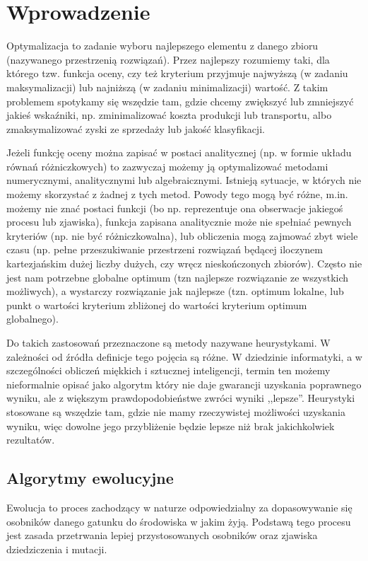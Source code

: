 \documentclass[./FM_mgr.tex]{subfiles}
\begin{document}
\chapter{Wprowadzenie}

Optymalizacja to zadanie wyboru najlepszego elementu z danego zbioru (nazywanego przestrzenią rozwiązań). 
Przez najlepszy rozumiemy taki, dla którego tzw. funkcja oceny, czy też kryterium przyjmuje najwyższą (w zadaniu maksymalizacji) lub najniższą (w zadaniu minimalizacji) wartość. 
Z takim problemem spotykamy się wszędzie tam, gdzie chcemy zwiększyć lub zmniejszyć jakieś wskaźniki, np. zminimalizować koszta produkcji lub transportu, albo zmaksymalizować zyski ze sprzedaży lub jakość klasyfikacji.

Jeżeli funkcję oceny można zapisać w postaci analitycznej (np. w formie układu równań różniczkowych) to zazwyczaj możemy ją optymalizować metodami numerycznymi, analitycznymi lub algebraicznymi. 
Istnieją sytuacje, w których nie możemy skorzystać z żadnej z tych metod. 
Powody tego mogą być różne, m.in. możemy nie znać postaci funkcji (bo np. reprezentuje ona obserwacje jakiegoś procesu lub zjawiska), funkcja zapisana analitycznie może nie spełniać pewnych kryteriów (np. nie być różniczkowalna), lub obliczenia mogą zajmować zbyt wiele czasu (np. pełne przeszukiwanie przestrzeni rozwiązań będącej iloczynem kartezjańskim dużej liczby dużych, czy wręcz nieskończonych zbiorów). 
Często nie jest nam potrzebne globalne optimum (tzn najlepsze rozwiązanie ze wszystkich możliwych), a wystarczy rozwiązanie jak najlepsze (tzn. optimum lokalne, lub punkt o wartości kryterium zbliżonej do wartości kryterium optimum globalnego).

Do takich zastosowań przeznaczone są metody nazywane heurystykami. 
W zależności od źródła definicje tego pojęcia są różne. 
W dziedzinie informatyki, a w szczególności obliczeń miękkich i sztucznej inteligencji, termin ten możemy nieformalnie opisać jako algorytm który nie daje gwarancji uzyskania poprawnego wyniku, ale z większym prawdopodobieństwe zwróci wyniki ,,lepsze''.
Heurystyki stosowane są wszędzie tam, gdzie nie mamy rzeczywistej możliwości uzyskania wyniku, więc dowolne jego przybliżenie będzie lepsze niż brak jakichkolwiek rezultatów.

\section{Algorytmy ewolucyjne} \label{section:eaShortDesc}

Ewolucja to proces zachodzący w naturze odpowiedzialny za dopasowywanie się osobników danego gatunku do środowiska w jakim żyją. 
Podstawą tego procesu jest zasada przetrwania lepiej przystosowanych osobników oraz zjawiska dziedziczenia i mutacji.
\end{document}
